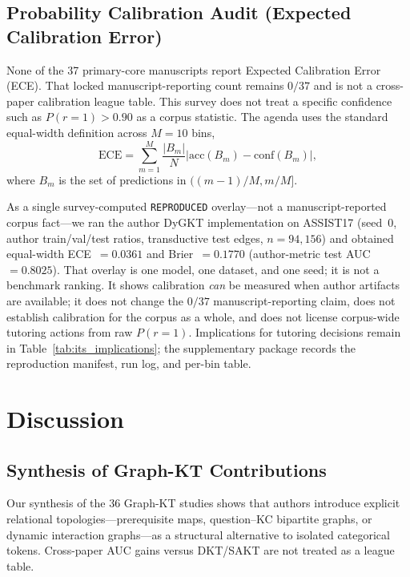 \documentclass[lettersize,journal]{IEEEtran}
\begin{document}
\subsection{Probability Calibration Audit (Expected Calibration Error)}
None of the 37 primary-core manuscripts report Expected Calibration Error (ECE). That locked manuscript-reporting count remains $0/37$ and is not a cross-paper calibration league table. This survey does not treat a specific confidence such as $P(r=1)>0.90$ as a corpus statistic. The agenda uses the standard equal-width definition across $M=10$ bins,
\begin{equation}
\text{ECE} = \sum_{m=1}^{M} \frac{|B_m|}{N} \left| \text{acc}(B_m) - \text{conf}(B_m) \right|,
\end{equation}
where $B_m$ is the set of predictions in $((m-1)/M, m/M]$.

As a single survey-computed \texttt{REPRODUCED} overlay---not a manuscript-reported corpus fact---we ran the author DyGKT implementation \cite{KT038_DyGKT_2024} on ASSIST17 (seed~$0$, author train/val/test ratios, transductive test edges, $n=94{,}156$) and obtained equal-width ECE~$=0.0361$ and Brier~$=0.1770$ (author-metric test AUC~$=0.8025$). That overlay is one model, one dataset, and one seed; it is not a benchmark ranking. It shows calibration \emph{can} be measured when author artifacts are available; it does not change the $0/37$ manuscript-reporting claim, does not establish calibration for the corpus as a whole, and does not license corpus-wide tutoring actions from raw $P(r=1)$. Implications for tutoring decisions remain in Table~\ref{tab:its_implications}; the supplementary package records the reproduction manifest, run log, and per-bin table.

\section{Discussion}
\label{sec:discussion}

\subsection{Synthesis of Graph-KT Contributions}
Our synthesis of the 36 Graph-KT studies shows that authors introduce explicit relational topologies---prerequisite maps, question--KC bipartite graphs, or dynamic interaction graphs---as a structural alternative to isolated categorical tokens. Cross-paper AUC gains versus DKT/SAKT are not treated as a league table.
\end{document}
